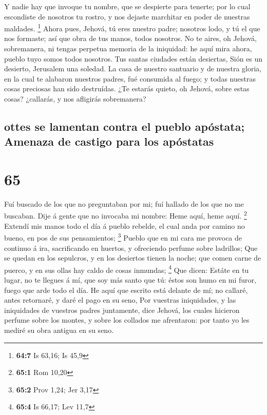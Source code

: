  Y nadie hay que invoque tu nombre, que se despierte para
tenerte; por lo cual escondiste de nosotros tu rostro, y nos dejaste
marchitar en poder de nuestras maldades. \footnote{\textbf{64:7} Is
  63,16; Is 45,9}  Ahora pues, Jehová, tú eres nuestro
padre; nosotros lodo, y tú el que nos formaste; así que obra de tus
manos, todos nosotros.  No te aires, oh Jehová,
sobremanera, ni tengas perpetua memoria de la iniquidad: he aquí mira
ahora, pueblo tuyo somos todos nosotros.  Tus santas
ciudades están desiertas, Sión es un desierto, Jerusalem una soledad.
 La casa de nuestro santuario y de nuestra gloria, en la
cual te alabaron nuestros padres, fué consumida al fuego; y todas
nuestras cosas preciosas han sido destruídas.  ¿Te
estarás quieto, oh Jehová, sobre estas cosas? ¿callarás, y nos afligirás
sobremanera?

\hypertarget{ottes-se-lamentan-contra-el-pueblo-apuxf3stata-amenaza-de-castigo-para-los-apuxf3statas}{%
\subsection{ottes se lamentan contra el pueblo apóstata; Amenaza de
castigo para los
apóstatas}\label{ottes-se-lamentan-contra-el-pueblo-apuxf3stata-amenaza-de-castigo-para-los-apuxf3statas}}

\hypertarget{section-64}{%
\section{65}\label{section-64}}

 Fuí buscado de los que no preguntaban por mi; fuí hallado
de los que no me buscaban. Dije á gente que no invocaba mi nombre: Heme
aquí, heme aquí. \footnote{\textbf{65:1} Rom 10,20} 
Extendí mis manos todo el día á pueblo rebelde, el cual anda por camino
no bueno, en pos de sus pensamientos; \footnote{\textbf{65:2} Prov 1,24;
  Jer 3,17}  Pueblo que en mi cara me provoca de continuo
á ira, sacrificando en huertos, y ofreciendo perfume sobre ladrillos;
 Que se quedan en los sepulcros, y en los desiertos tienen
la noche; que comen carne de puerco, y en sus ollas hay caldo de cosas
inmundas; \footnote{\textbf{65:4} Is 66,17; Lev 11,7}  Que
dicen: Estáte en tu lugar, no te llegues á mí, que soy más santo que tú:
éstos son humo en mi furor, fuego que arde todo el día. 
He aquí que escrito está delante de mí; no callaré, antes retornaré, y
daré el pago en su seno,  Por vuestras iniquidades, y las
iniquidades de vuestros padres juntamente, dice Jehová, los cuales
hicieron perfume sobre los montes, y sobre los collados me afrentaron:
por tanto yo les mediré su obra antigua en su seno.

